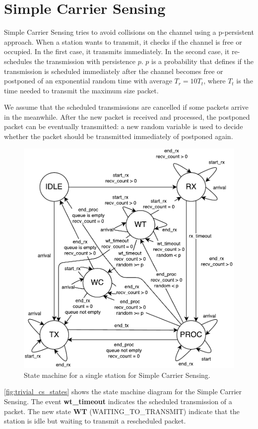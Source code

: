 \section{Simple Carrier Sensing}
\label{sec:simple}

Simple Carrier Sensing tries to avoid collisions on the channel using a p-persistent approach.
When a station wants to transmit, it checks if the channel is free or occupied.
In the first case, it transmits immediately.
In the second case, it re-schedules the transmission with persistence $p$. $p$ is a probability that defines if the transmission is scheduled immediately after the channel becomes free or postponed of an exponential random time with average $T_r = 10T_t$, where $T_t$ is the time needed to transmit the maximum size packet.

We assume that the scheduled transmissions are cancelled if some packets arrive in the meanwhile.
After the new packet is received and processed, the postponed packet can be eventually transmitted: a new random variable is used to decide whether the packet should be transmitted immediately of postponed again.

\begin{figure}[ht]
	\centering
	\includegraphics[width=\columnwidth]{figures/states/simple}
	\caption{State machine for a single station for Simple Carrier Sensing.}
	\label{fig:simple_cs_states}
\end{figure}

\cref{fig:trivial_cs_states} shows the state machine diagram for the Simple Carrier Sensing.
The event \textbf{wt\_timeout} indicates the scheduled transmission of a packet.
The new state \textbf{WT} (WAITING\_TO\_TRANSMIT) indicate that the station is idle but waiting to transmit a rescheduled packet.

